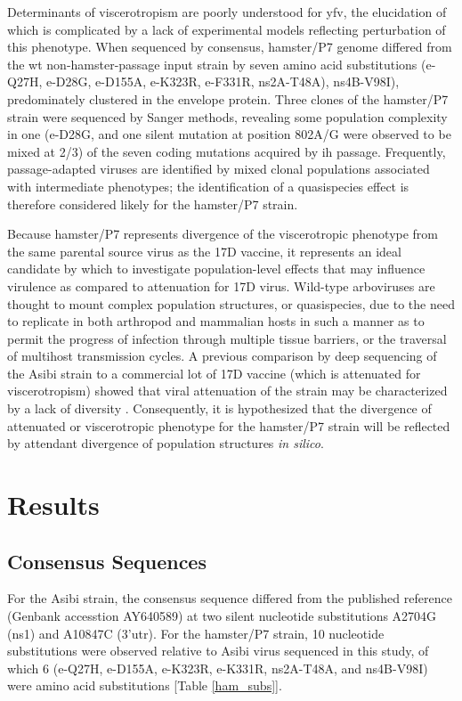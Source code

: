Determinants of viscerotropism are poorly understood for \gls{yfv}, the elucidation of which is complicated by a lack of experimental models reflecting perturbation of this phenotype. When sequenced by consensus, hamster/P7 genome differed from the \gls{wt} non-hamster-passage input strain by seven amino acid substitutions (\gls{e}-Q27H, \gls{e}-D28G, \gls{e}-D155A, \gls{e}-K323R, \gls{e}-F331R, \gls{ns}2A-T48A), \gls{ns}4B-V98I), predominately clustered in the envelope protein. Three clones of the hamster/P7 strain were sequenced by Sanger methods, revealing some population complexity in one (\gls{e}-D28G,  and one silent mutation at position 802A/G were observed to be mixed at 2/3) of the seven coding mutations acquired by \gls{ih} passage. Frequently, passage-adapted viruses are identified by mixed clonal populations associated with intermediate phenotypes; the identification of a quasispecies effect is therefore considered likely for the hamster/P7 strain.

Because hamster/P7 represents divergence of the viscerotropic phenotype from the same parental source virus as the 17D vaccine, it represents an ideal candidate by which to investigate population-level effects that may influence virulence as compared to attenuation for 17D virus. Wild-type arboviruses are thought to mount complex population structures, or quasispecies, due to the need to replicate in both arthropod and mammalian hosts in such a manner as to permit the progress of infection through multiple tissue barriers, or the traversal of multihost transmission cycles. A previous comparison by deep sequencing of the Asibi strain to a commercial lot of 17D vaccine (which is attenuated for viscerotropism) showed that viral attenuation of the strain may be characterized by a lack of diversity \parencite{Beck:2014cm}. Consequently, it is hypothesized that the divergence of attenuated or viscerotropic phenotype for the hamster/P7 strain will be reflected by attendant divergence of population structures \emph{in silico}.

\section{Results}
\subsection{Consensus Sequences}
For the Asibi strain, the consensus sequence differed from the published reference (Genbank accesstion AY640589) at two silent nucleotide substitutions A2704G (\gls{ns}1) and A10847C (3’\gls{utr}). For the hamster/P7 strain, 10 nucleotide substitutions were observed relative to Asibi virus sequenced in this study, of which 6 (\gls{e}-Q27H, \gls{e}-D155A, \gls{e}-K323R, \gls{e}-K331R, \gls{ns}2A-T48A, and \gls{ns}4B-V98I) were amino acid substitutions [Table \ref{ham_subs}].
